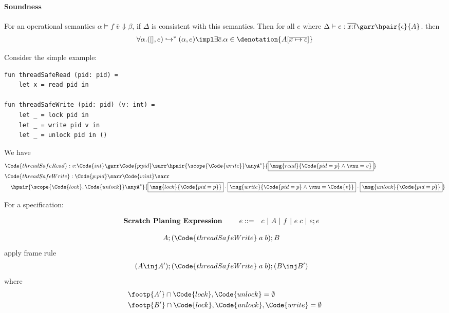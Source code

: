 \paragraph{Soundness} For an operational semantics $\alpha \vDash f\;\overline{v} \Downarrow \beta$, if $\Delta$ is consistent with this semantics. Then for all $e$ where $\Delta \vdash e : \overline{x{:}t}\garr \hpair{\epsilon}{A}$. then
\begin{align*}
    \forall \alpha. ([], e) \hookrightarrow^* (\alpha, e) \impl \exists \overline{c}. \alpha \in \denotation{A[\overline{x \mapsto c}]}
\end{align*}

\begin{example}Consider the simple example:

\begin{verbatim}
fun threadSafeRead (pid: pid) =
    let x = read pid in

fun threadSafeWrite (pid: pid) (v: int) =
    let _ = lock pid in
    let _ = write pid v in
    let _ = unlock pid in ()
\end{verbatim}

We have
{\footnotesize\begin{align*}
    &\Code{threadSafeRead} : v{:}\Code{int}\garr \Code{p{:}pid}\sarr\hpair{\scope{\Code{write}} \anyA^*}{\boxed{\msg{read}{\Code{pid = p} \land \vnu = v}}}
    \\&\Code{threadSafeWrite} : \Code{p{:}pid}\sarr\Code{v{:}int}\sarr
    \\&\quad \hpair{\scope{\Code{lock},\Code{unlock}} \anyA^*}{\boxed{\msg{lock}{\Code{pid = p}}} \cdot \boxed{\msg{write}{\Code{pid = p} \land \vnu = \Code{v}}} \cdot \boxed{\msg{unlock}{\Code{pid = p}}}}
\end{align*}}

For a specification:

\begin{alignat*}{5}
\text{\textbf{Scratch Planing Expression }}& \quad &e ::= \quad & c ~|~ A ~|~ f ~|~ e\;c ~|~ e;e
  \end{alignat*}

{\footnotesize\begin{align*}
    &A; (\Code{threadSafeWrite}\;a\;b); B
\end{align*}}\noindent
apply frame rule
{\footnotesize\begin{align*}
    &(A \inj A'); (\Code{threadSafeWrite}\;a\;b); (B \inj B')
\end{align*}}\noindent
where
{\footnotesize\begin{align*}
    &\footp{A'} \cap \Code{lock},\Code{unlock} = \emptyset
    \\&\footp{B'} \cap \Code{lock},\Code{unlock},\Code{write} = \emptyset
\end{align*}}\noindent


\end{example}
